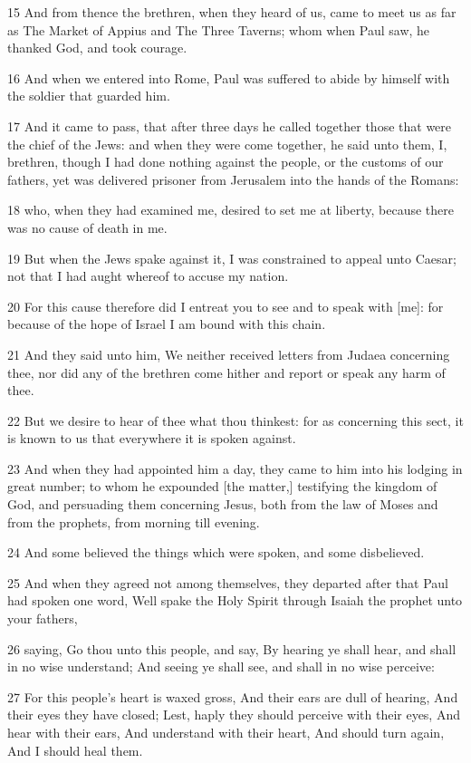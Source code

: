 \par 15 And from thence the brethren, when they heard of us, came to meet us as far as The Market of Appius and The Three Taverns; whom when Paul saw, he thanked God, and took courage.
\par 16 And when we entered into Rome, Paul was suffered to abide by himself with the soldier that guarded him.
\par 17 And it came to pass, that after three days he called together those that were the chief of the Jews: and when they were come together, he said unto them, I, brethren, though I had done nothing against the people, or the customs of our fathers, yet was delivered prisoner from Jerusalem into the hands of the Romans:
\par 18 who, when they had examined me, desired to set me at liberty, because there was no cause of death in me.
\par 19 But when the Jews spake against it, I was constrained to appeal unto Caesar; not that I had aught whereof to accuse my nation.
\par 20 For this cause therefore did I entreat you to see and to speak with [me]: for because of the hope of Israel I am bound with this chain.
\par 21 And they said unto him, We neither received letters from Judaea concerning thee, nor did any of the brethren come hither and report or speak any harm of thee.
\par 22 But we desire to hear of thee what thou thinkest: for as concerning this sect, it is known to us that everywhere it is spoken against.
\par 23 And when they had appointed him a day, they came to him into his lodging in great number; to whom he expounded [the matter,] testifying the kingdom of God, and persuading them concerning Jesus, both from the law of Moses and from the prophets, from morning till evening.
\par 24 And some believed the things which were spoken, and some disbelieved.
\par 25 And when they agreed not among themselves, they departed after that Paul had spoken one word, Well spake the Holy Spirit through Isaiah the prophet unto your fathers,
\par 26 saying, Go thou unto this people, and say, By hearing ye shall hear, and shall in no wise understand; And seeing ye shall see, and shall in no wise perceive:
\par 27 For this people's heart is waxed gross, And their ears are dull of hearing, And their eyes they have closed; Lest, haply they should perceive with their eyes, And hear with their ears, And understand with their heart, And should turn again, And I should heal them.
